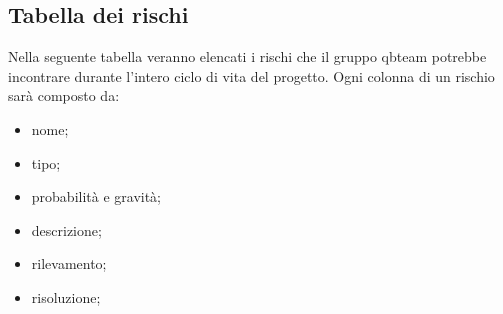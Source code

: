 \subsection{Tabella dei rischi}
Nella seguente tabella veranno elencati i rischi che il gruppo qbteam potrebbe incontrare durante l'intero ciclo di vita del progetto.
Ogni colonna di un rischio sarà composto da:
\begin{itemize}
	\item nome;
	\item tipo;
	\item probabilità e gravità;
	\item descrizione;
	\item rilevamento;
	\item risoluzione;
\end{itemize}
